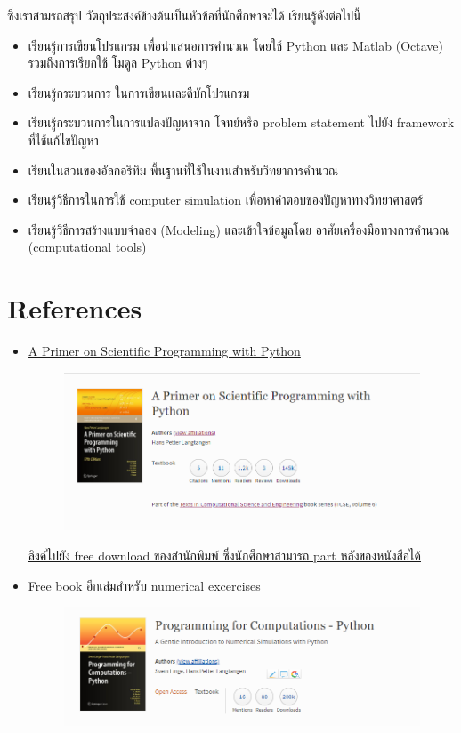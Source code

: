 \documentclass[12pt,a4paper]{article}
\begin{document}
ซึ่งเราสามรถสรุป วัตถุประสงค์ข้างต้นเป็นหัวข้อที่นักศึกษาจะได้ เรียนรู้ดังต่อไปนี้
\begin{itemize}
	\item เรียนรู้การเขียนโปรแกรม เพื่อนำเสนอการคำนวณ โดยใช้ Python และ Matlab (Octave) รวมถึงการเรียกใช้ โมดูล Python ต่างๆ  
	\item เรียนรู้กระบวนการ ในการเขียนเเละดีบักโปรแกรม
	\item เรียนรู้กระบวนการในการแปลงปัญหาจาก โจทย์หรือ problem statement ไปยัง framework ที่ใช้แก้ไขปัญหา 
	\item เรียนในส่วนของอัลกอริทึม พื้นฐานที่ใช้ในงานสำหรับวิทยาการคำนวณ   
	\item เรียนรู้วิธีการในการใช้ computer simulation เพื่อหาคำตอบของปัญหาทางวิทยาศาสตร์
	\item เรียนรู้วิธีการสร้างแบบจำลอง (Modeling) และเข้าใจข้อมูลโดย อาศัยเครื่องมือทางการคำนวณ (computational tools) 

\end{itemize}

\section {References}
\begin{itemize}
	\item \href{https://hplgit.github.io/primer.html/doc/pub/half/book.pdf}{A Primer on Scientific
		Programming with Python}
	\begin{figure}[H]
		\centering
		\includegraphics[width=0.7\linewidth]{PIC/book1}
		\caption{}
		\label{fig:book1}
	\end{figure}
	

\href{https://link.springer.com/book/10.1007/978-3-662-49887-3}{ลิงค์ไปยัง free download ของสำนักพิมพ์ ซึ่งนักศึกษาสามารถ part หลังของหนังสือได้ }
	
	
	\item \href{https://link.springer.com/book/10.1007%2F978-3-319-32428-9}{Free book อีกเล่มสำหรับ numerical excercises }
	\begin{figure} [H]
		\centering
		\includegraphics[width=0.7\linewidth]{PIC/book2}
		\caption{}
		\label{fig:book2}
	\end{figure}
	
\end{itemize}
\end{document}
